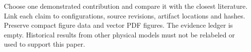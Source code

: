 \documentclass[11pt]{article}
\begin{document}
Choose one demonstrated contribution and compare it with the closest literature. Link each claim to configurations, source revisions,
artifact locations and hashes. Preserve compact figure data and vector PDF
figures. The evidence ledger is empty. Historical results from other physical
models must not be relabeled or used to support this paper.
\end{document}
